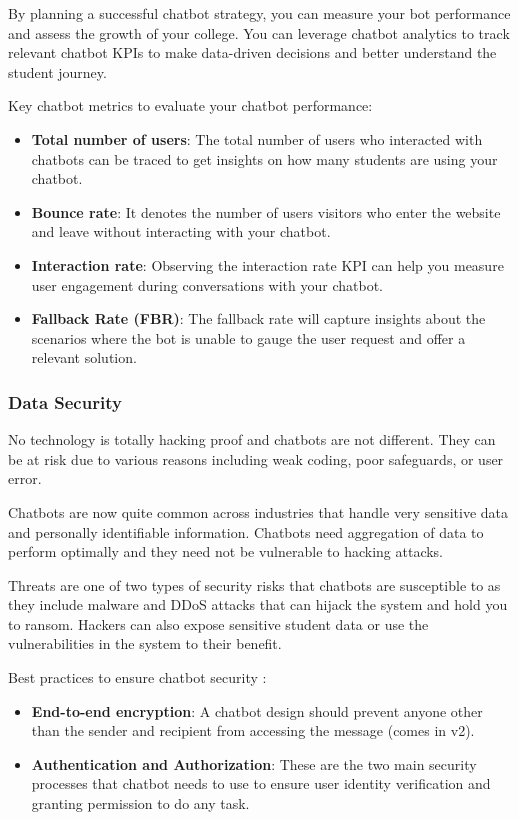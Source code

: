\documentclass[14pt]{extarticle}
\begin{document}
By planning a successful chatbot strategy, you can measure your bot performance and assess the growth of your college.  You can leverage chatbot analytics to track relevant chatbot KPIs to make data-driven decisions and better understand the student journey.

\vspace{2em}
Key chatbot metrics to evaluate your chatbot performance:
\begin{itemize}
    \item \textbf{Total number of users}: The total number of users who interacted with chatbots can be traced to get insights on how many students are using your chatbot.
    \item \textbf{Bounce rate}: It denotes the number of users visitors who enter the website and leave without interacting with your chatbot.
    \item \textbf{Interaction rate}: Observing the interaction rate KPI can help you measure user engagement during conversations with your chatbot.
    \item \textbf{Fallback Rate (FBR)}: The fallback rate will capture insights about the scenarios where the bot is unable to gauge the user request and offer a relevant solution.
\end{itemize}

\subsubsection {Data Security}

No technology is totally hacking proof and chatbots are not different. They can be at risk due to various reasons including weak coding, poor safeguards, or user error.

Chatbots are now quite common across industries that handle very sensitive data and personally identifiable information. Chatbots need aggregation of data to perform optimally and they need not be vulnerable to hacking attacks.

Threats are one of two types of security risks that chatbots are susceptible to as they include malware and DDoS attacks that can hijack the system and hold you to ransom. Hackers can also expose sensitive student data or use the vulnerabilities in the system to their benefit.

Best practices to ensure chatbot security :
\begin{itemize}
    \item \textbf{End-to-end encryption}: A chatbot design should prevent anyone other than the sender and recipient from accessing the message (comes in v2).
    \item \textbf{Authentication and Authorization}: These are the two main security processes that chatbot needs to use to ensure user identity verification and granting permission to do any task.
\end{itemize}
\end{document}
